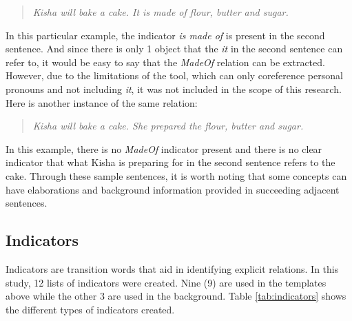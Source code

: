 \begin{verse}
\itshape
Kisha will bake a cake. It is made of flour, butter and sugar. \\
\end{verse}

In this particular example, the indicator \textit{is made of} is present in the second sentence. And since there is only 1 object that the \textit{it} in the second sentence can refer to, it would be easy to say that the \textit{MadeOf} relation can be extracted. However, due to the limitations of the tool, which can only coreference personal pronouns and not including \textit{it}, it was not included in the scope of this research. Here is another instance of the same relation:

\begin{verse}
\itshape
Kisha will bake a cake. She prepared the flour, butter and sugar. \\
\end{verse}

In this example, there is no \textit{MadeOf} indicator present and there is no clear indicator that what Kisha is preparing for in the second sentence refers to the cake. Through these sample sentences, it is worth noting that some concepts can have elaborations and background information provided in succeeding adjacent sentences.

\subsection{Indicators}
\label{sec:indicators}

Indicators are transition words that aid in identifying explicit relations. In this study, 12 lists of indicators were created. Nine (9) are used in the templates above while the other 3 are used in the background. Table \ref{tab:indicators} shows the different types of indicators created.

